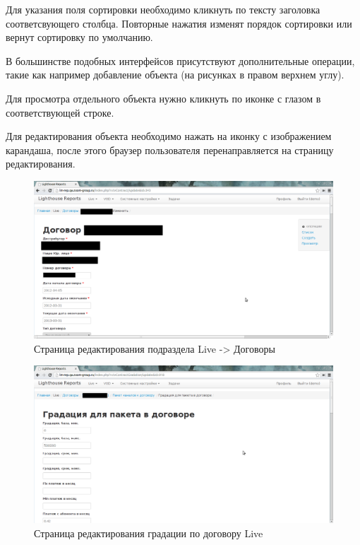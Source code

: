 Для указания поля сортировки необходимо кликнуть по тексту заголовка соответсвующего столбца. 
Повторные нажатия изменят порядок сортировки или вернут сортировку по умолчанию.

В большинстве подобных интерфейсов присутствуют дополнительные операции, такие как например добавление объекта
(на рисунках в правом верхнем углу).

Для просмотра отдельного объекта нужно кликнуть по иконке с глазом в соответствующей строке.

Для редактирования объекта необходимо нажать на иконку с изображением карандаша, после этого браузер пользователя
перенаправляется на страницу редактирования.

\begin{figure}[!ht]
\begin{center}
\hspace*{-1cm} \includegraphics[scale=0.35, trim=0mm 0mm 120mm 10mm, clip]{../resources/screens/contract_edit.png}
\caption{Страница редактирования подраздела Live -> Договоры}
\end{center}
\end{figure}

\begin{figure}[!ht]
\begin{center}
\hspace*{-1cm} \includegraphics[scale=0.35, trim=0mm 0mm 120mm 10mm, clip]{../resources/screens/contract_gradation.png}
\caption{Страница редактирования градации по договору Live}
\end{center}
\end{figure}

